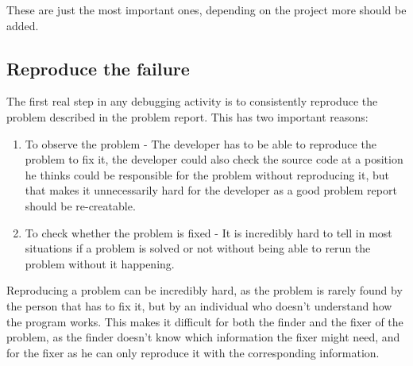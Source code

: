 These are just the most important ones, depending on the project more should be added.

\subsection{Reproduce the failure}
\label{aodZellerReproduce}
The first real step in any debugging activity is to consistently reproduce the problem described in the problem report. This has two important reasons:

\begin{enumerate}
  \item To observe the problem - The developer has to be able to reproduce the problem to fix it, the developer could also check the source code at a position he thinks could be responsible for the problem without reproducing it, but that makes it unnecessarily hard for the developer as a good problem report should be re-creatable.
  \item To check whether the problem is fixed - It is incredibly hard to tell in most situations if a problem is solved or not without being able to rerun the problem without it happening.
\end{enumerate}

Reproducing a problem can be incredibly hard, as the problem is rarely found by the person that has to fix it, but by an individual who doesn't understand how the program works. This makes it difficult for both the finder and the fixer of the problem, as the finder doesn't know which information the fixer might need, and for the fixer as he can only reproduce it with the corresponding information.

